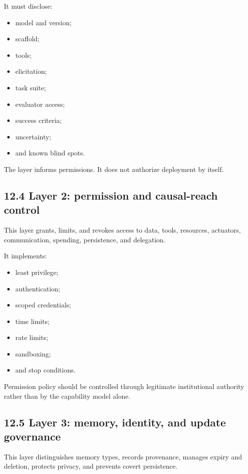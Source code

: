 \documentclass[
  11pt,
]{article}
\providecommand{\tightlist}{%
  \setlength{\itemsep}{0pt}\setlength{\parskip}{0pt}}
\begin{document}
It must disclose:

\begin{itemize}
\tightlist
\item
  model and version;
\item
  scaffold;
\item
  tools;
\item
  elicitation;
\item
  task suite;
\item
  evaluator access;
\item
  success criteria;
\item
  uncertainty;
\item
  and known blind spots.
\end{itemize}

The layer informs permissions. It does not authorize deployment by
itself.

\subsection{12.4 Layer 2: permission and causal-reach
control}\label{layer-2-permission-and-causal-reach-control}

This layer grants, limits, and revokes access to data, tools, resources,
actuators, communication, spending, persistence, and delegation.

It implements:

\begin{itemize}
\tightlist
\item
  least privilege;
\item
  authentication;
\item
  scoped credentials;
\item
  time limits;
\item
  rate limits;
\item
  sandboxing;
\item
  and stop conditions.
\end{itemize}

Permission policy should be controlled through legitimate institutional
authority rather than by the capability model alone.

\subsection{12.5 Layer 3: memory, identity, and update
governance}\label{layer-3-memory-identity-and-update-governance}

This layer distinguishes memory types, records provenance, manages
expiry and deletion, protects privacy, and prevents covert persistence.
\end{document}
